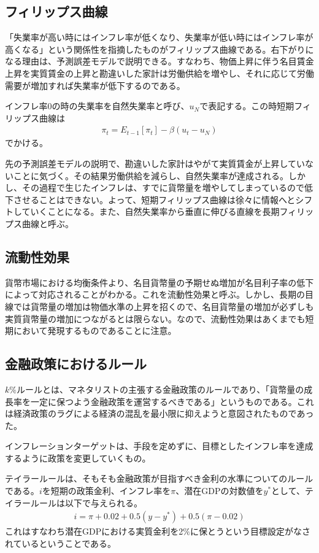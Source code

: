 \documentclass{jsarticle}
\begin{document}
\subsection{フィリップス曲線}
「失業率が高い時にはインフレ率が低くなり、失業率が低い時にはインフレ率が高くなる」という関係性を指摘したものがフィリップス曲線である。右下がりになる理由は、予測誤差モデルで説明できる。すなわち、物価上昇に伴う名目賃金上昇を実質賃金の上昇と勘違いした家計は労働供給を増やし、それに応じて労働需要が増加すれば失業率が低下するのである。

インフレ率0の時の失業率を自然失業率と呼び、$u_N$で表記する。この時短期フィリップス曲線は
\begin{align*}
	\pi_t = E_{t-1}[\pi_t] - \beta (u_t - u_N)
\end{align*}
でかける。

先の予測誤差モデルの説明で、勘違いした家計はやがて実質賃金が上昇していないことに気づく。その結果労働供給を減らし、自然失業率が達成される。しかし、その過程で生じたインフレは、すでに貨幣量を増やしてしまっているので低下させることはできない。よって、短期フィリップス曲線は徐々に情報へとシフトしていくことになる。また、自然失業率から垂直に伸びる直線を長期フィリップス曲線と呼ぶ。

\subsection{流動性効果}
貨幣市場における均衡条件より、名目貨幣量の予期せぬ増加が名目利子率の低下によって対応されることがわかる。これを流動性効果と呼ぶ。しかし、長期の目線では貨幣量の増加は物価水準の上昇を招くので、名目貨幣量の増加が必ずしも実質貨幣量の増加につながるとは限らない。なので、流動性効果はあくまでも短期において発現するものであることに注意。

\subsection{金融政策におけるルール}
$k\%$ルールとは、マネタリストの主張する金融政策のルールであり、「貨幣量の成長率を一定に保つよう金融政策を運営するべきである」というものである。これは経済政策のラグによる経済の混乱を最小限に抑えようと意図されたものであった。

インフレーションターゲットは、手段を定めずに、目標としたインフレ率を達成するように政策を変更していくもの。

テイラールールは、そもそも金融政策が目指すべき金利の水準についてのルールである。$i$を短期の政策金利、インフレ率を$\pi$、潜在GDPの対数値を$y^*$として、テイラールールは以下で与えられる。
\begin{align}
	i = \pi + 0.02 + 0.5(y - y^*) + 0.5(\pi -0.02)
\end{align}
これはすなわち潜在GDPにおける実質金利を2$\%$に保とうという目標設定がなされているということである。
\end{document}
